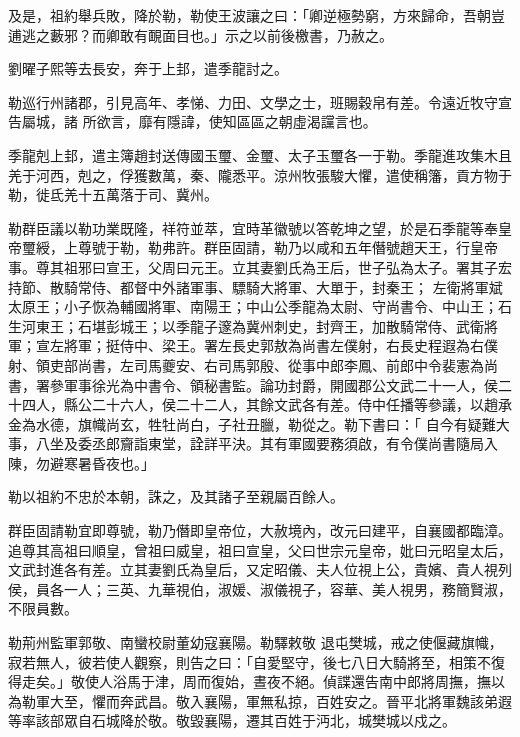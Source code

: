 \begin{pinyinscope}
 及是，祖約舉兵敗，降於勒，勒使王波讓之曰：「卿逆極勢窮，方來歸命，吾朝豈逋逃之藪邪？而卿敢有靦面目也。」示之以前後檄書，乃赦之。



 劉曜子熙等去長安，奔于上邽，遣季龍討之。



 勒巡行州諸郡，引見高年、孝悌、力田、文學之士，班賜穀帛有差。令遠近牧守宣告屬城，諸
 所欲言，靡有隱諱，使知區區之朝虛渴讜言也。



 季龍剋上邽，遣主簿趙封送傳國玉璽、金璽、太子玉璽各一于勒。季龍進攻集木且羌于河西，剋之，俘獲數萬，秦、隴悉平。涼州牧張駿大懼，遣使稱籓，貢方物于勒，徙氐羌十五萬落于司、冀州。



 勒群臣議以勒功業既隆，祥符並萃，宜時革徽號以答乾坤之望，於是石季龍等奉皇帝璽綬，上尊號于勒，勒弗許。群臣固請，勒乃以咸和五年僭號趙天王，行皇帝事。尊其祖邪曰宣王，父周曰元王。立其妻劉氏為王后，世子弘為太子。署其子宏持節、散騎常侍、都督中外諸軍事、驃騎大將軍、大單于，封秦王；
 左衛將軍斌太原王；小子恢為輔國將軍、南陽王；中山公季龍為太尉、守尚書令、中山王；石生河東王；石堪彭城王；以季龍子邃為冀州刺史，封齊王，加散騎常侍、武衛將軍；宣左將軍；挺侍中、梁王。署左長史郭敖為尚書左僕射，右長史程遐為右僕射、領吏部尚書，左司馬夔安、右司馬郭殷、從事中郎李鳳、前郎中令裴憲為尚書，署參軍事徐光為中書令、領秘書監。論功封爵，開國郡公文武二十一人，侯二十四人，縣公二十六人，侯二十二人，其餘文武各有差。侍中任播等參議，以趙承金為水德，旗幟尚玄，牲牡尚白，子社丑臘，勒從之。勒下書曰：「
 自今有疑難大事，八坐及委丞郎齎詣東堂，詮詳平決。其有軍國要務須啟，有令僕尚書隨局入陳，勿避寒暑昏夜也。」



 勒以祖約不忠於本朝，誅之，及其諸子至親屬百餘人。



 群臣固請勒宜即尊號，勒乃僭即皇帝位，大赦境內，改元曰建平，自襄國都臨漳。追尊其高祖曰順皇，曾祖曰威皇，祖曰宣皇，父曰世宗元皇帝，妣曰元昭皇太后，文武封進各有差。立其妻劉氏為皇后，又定昭儀、夫人位視上公，貴嬪、貴人視列侯，員各一人；三英、九華視伯，淑媛、淑儀視子，容華、美人視男，務簡賢淑，不限員數。



 勒荊州監軍郭敬、南蠻校尉董幼寇襄陽。勒驛敕敬
 退屯樊城，戒之使偃藏旗幟，寂若無人，彼若使人觀察，則告之曰：「自愛堅守，後七八日大騎將至，相策不復得走矣。」敬使人浴馬于津，周而復始，晝夜不絕。偵諜還告南中郎將周撫，撫以為勒軍大至，懼而奔武昌。敬入襄陽，軍無私掠，百姓安之。晉平北將軍魏該弟遐等率該部眾自石城降於敬。敬毀襄陽，遷其百姓于沔北，城樊城以戍之。




\end{pinyinscope}

